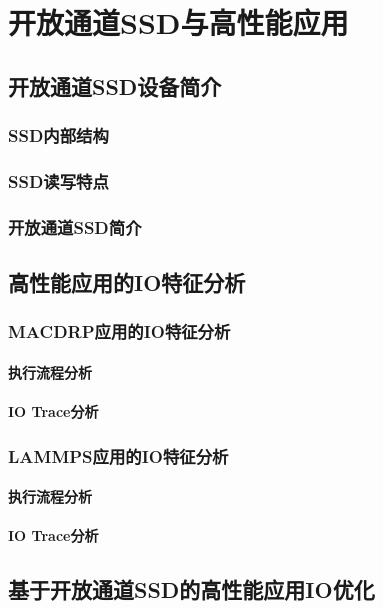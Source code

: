 \chapter{开放通道SSD与高性能应用}
\label{cha:ssd_hpc}

\section{开放通道SSD设备简介}
\subsection{SSD内部结构}
\subsection{SSD读写特点}
\subsection{开放通道SSD简介}

\section{高性能应用的IO特征分析}
\subsection{MACDRP应用的IO特征分析}
\subsubsection{执行流程分析}
\subsubsection{IO Trace分析}
\subsection{LAMMPS应用的IO特征分析}
\subsubsection{执行流程分析}
\subsubsection{IO Trace分析}

\section{基于开放通道SSD的高性能应用IO优化}
